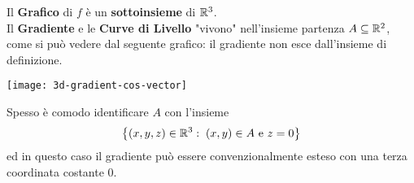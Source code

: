 \begin{observation}
	Il \textbf{Grafico} di $f$ è un \textbf{sottoinsieme} di $\mathbb{R}^3$.\\
	Il \textbf{Gradiente} e le \textbf{Curve di Livello} "vivono" nell'insieme partenza $A \subseteq \mathbb{R}^2$, come si può vedere dal seguente grafico: il gradiente non esce dall'insieme di definizione.
	\begin{center}
		\texttt{[image: 3d-gradient-cos-vector]} %
	\end{center}
	Spesso è comodo identificare $A$ con l'insieme
	\[\left\{(x,y,z) \in \mathbb{R}^3:\; (x,y) \in A \text{ e } z = 0\right\}\]
	ed in questo caso il gradiente può essere convenzionalmente esteso con una terza coordinata costante $0$.
\end{observation}

